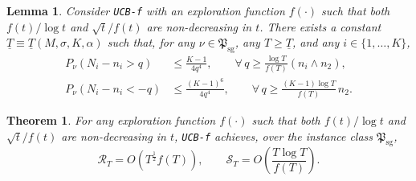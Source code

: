 \documentclass[10pt,a4paper]{amsart}
\newtheorem{theorem}{Theorem}
\newtheorem{lemma}{Lemma}
\begin{document}
\begin{lemma}\label{lem:N_i_tail_bound}
Consider \texttt{UCB-f} with an exploration function $f(\cdot)$ such that both
$f(t)/\log t$ and $\sqrt{t}/f(t)$ are non-decreasing in $t$. There exists a constant
$\underline{T}\equiv \underline{T}(M,\sigma,K,\alpha)$ such that, for any
$\nu\in\mathfrak{P}_{\mathrm{sg}}$, any $T\ge \underline{T}$, and any $i\in\{1,\dots,K\}$,
\begin{align*}
P_{\nu}\!\left(N_i-n_i>q\right)
&\le \frac{K-1}{4q^4},
\qquad \forall\, q\ge \frac{\log T}{f(T)}\left(n_i\wedge n_2\right),\\
P_{\nu}\!\left(N_i-n_i<-q\right)
&\le \frac{(K-1)^6}{4q^4},
\qquad \forall\, q\ge \frac{(K-1)\log T}{f(T)}\,n_2.
\end{align*}
\end{lemma}

\begin{theorem}\label{thm:ucb-f}
For any exploration function $f(\cdot)$ such that both $f(t)/\log t$ and $\sqrt{t}/f(t)$ are non-decreasing in $t$, \texttt{UCB-f} achieves, over the instance class $\mathfrak{P}_{\mathrm{sg}}$,
\[
\mathcal{R}_T = O\!\left(T^{\frac12}f(T)\right),
\qquad
\mathcal{S}_T = O\!\left(\frac{T \log T}{f(T)}\right).
\]
\end{theorem}
\end{document}

